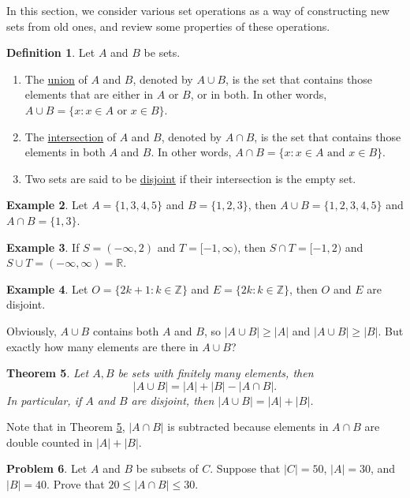 \documentclass[12pt,letterpaper]{book}
\numberwithin{equation}{section}
\newtheorem{thm}{\textbf{Theorem}}[section]
\theoremstyle{definition}
\newtheorem{defi}[thm]{\textbf{Definition}}
\newtheorem{problem}[thm]{\textbf{Problem}}
\newtheorem{example}[thm]{\textbf{Example}}
\begin{document}
In this section, we consider various set operations as a way of constructing new sets from old ones, and review some properties of these operations.

\begin{defi} Let $A$ and $B$ be sets.
\begin{enumerate}
\item The \underline{union} of $A$ and $B$, denoted by $A\cup B$, is the set that contains those elements that are either in $A$ or $B$, or in both. In other words, $A\cup B=\{x: x\in A \text{ or } x\in B\}$.
\item The \underline{intersection} of $A$ and $B$, denoted by $A\cap B$, is the set that contains those elements in both $A$ and $B$. In other words, $A\cap B=\{x: x\in A \text{ and } x\in B\}$.
\item Two sets are said to be \underline{disjoint} if their intersection is the empty set.
\end{enumerate}
\end{defi}

\begin{example} Let $A=\{1,3,4,5\}$ and $B=\{1,2,3\}$, then $A\cup B=\{1,2,3,4,5\}$ and $A\cap B=\{1,3\}$.
\end{example}

\begin{example}
If $S=(-\infty, 2)$ and $T=[-1,\infty)$, then $S\cap T=[-1,2)$ and $S\cup T=(-\infty,\infty)=\mathbb{R}$.
\end{example}

\begin{example}\label{oddeven} Let $O=\{2k+1: k\in \mathbb{Z}\}$ and $E=\{2k: k\in \mathbb{Z}\}$, then $O$ and $E$ are disjoint.
\end{example}

Obviously, $A\cup B$ contains both $A$ and $B$, so $|A\cup B|\geq |A|$ and $|A\cup B|\geq |B|$. But exactly how many elements are there in $A\cup B$?

\begin{thm}\label{union number} Let $A,B$ be sets with finitely many elements, then
$$|A\cup B|=|A|+|B|-|A\cap B|.$$ In particular, if $A$ and $B$ are disjoint, then $|A\cup B|=|A|+|B|$.
\end{thm}

Note that in Theorem \ref{union number}, $|A\cap B|$ is subtracted because elements in $A\cap B$ are double counted in $|A|+|B|$.

\begin{problem} Let $A$ and $B$ be subsets of $C$. Suppose that $|C|=50$, $|A|=30$, and $|B|=40$. Prove that
$20\leq |A\cap B|\leq 30$.
\end{problem}
\end{document}
